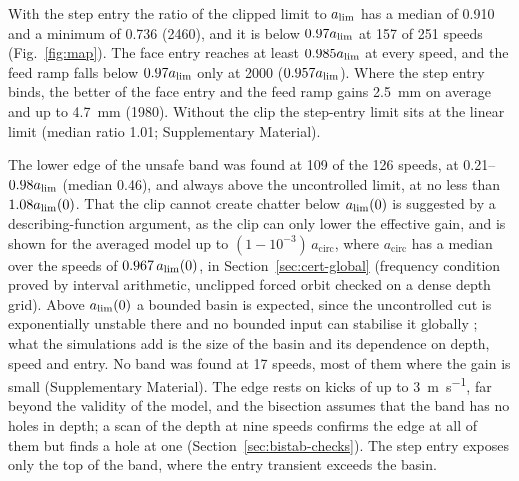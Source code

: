 With the step entry the ratio of the clipped limit to $a_{\lim}$ has a median of 0.910 and a minimum of 0.736 (\SI{2460}{\rpm}), and it is below $0.97a_{\lim}$ at 157 of 251 speeds (Fig.~\ref{fig:map}). The face entry reaches at least $0.985a_{\lim}$ at every speed, and the feed ramp falls below $0.97a_{\lim}$ only at \SI{2000}{\rpm} ($0.957a_{\lim}$). Where the step entry binds, the better of the face entry and the feed ramp gains \SI{2.5}{\milli\metre} on average and up to \SI{4.7}{\milli\metre} (\SI{1980}{\rpm}). Without the clip the step-entry limit sits at the linear limit (median ratio 1.01; Supplementary Material).

The lower edge of the unsafe band was found at 109 of the 126 speeds, at 0.21--$0.98a_{\lim}$ (median 0.46), and always above the uncontrolled limit, at no less than $1.08a_{\lim}(0)$. That the clip cannot create chatter below $a_{\lim}(0)$ is suggested by a describing-function argument, as the clip can only lower the effective gain, and is shown for the averaged model up to $(1-10^{-3})\,a_{\mathrm{circ}}$, where $a_{\mathrm{circ}}$ has a median over the speeds of $0.967\,a_{\lim}(0)$, in Section~\ref{sec:cert-global} (frequency condition proved by interval arithmetic, unclipped forced orbit checked on a dense depth grid). Above $a_{\lim}(0)$ a bounded basin is expected, since the uncontrolled cut is exponentially unstable there and no bounded input can stabilise it globally \citep{hu2001book}; what the simulations add is the size of the basin and its dependence on depth, speed and entry. No band was found at 17 speeds, most of them where the gain is small (Supplementary Material). The edge rests on kicks of up to \SI{3}{\metre\per\second}, far beyond the validity of the model, and the bisection assumes that the band has no holes in depth; a scan of the depth at nine speeds confirms the edge at all of them but finds a hole at one (Section~\ref{sec:bistab-checks}). The step entry exposes only the top of the band, where the entry transient exceeds the basin.

